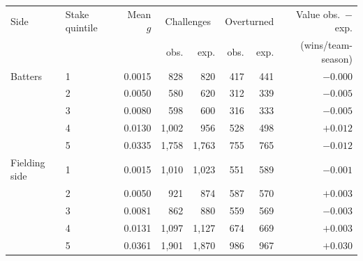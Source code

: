 \begin{tabular}{llrrrrrr}
\toprule
Side & Stake quintile & Mean $g$ & \multicolumn{2}{c}{Challenges} & \multicolumn{2}{c}{Overturned} & Value obs.\ $-$ exp. \\
 & & & obs. & exp. & obs. & exp. & (wins/team-season) \\
\midrule
Batters & 1 & 0.0015 & 828 & 820 & 417 & 441 & $-0.000$ \\
 & 2 & 0.0050 & 580 & 620 & 312 & 339 & $-0.005$ \\
 & 3 & 0.0080 & 598 & 600 & 316 & 333 & $-0.005$ \\
 & 4 & 0.0130 & 1{,}002 & 956 & 528 & 498 & $+0.012$ \\
 & 5 & 0.0335 & 1{,}758 & 1{,}763 & 755 & 765 & $-0.012$ \\
\addlinespace
Fielding side & 1 & 0.0015 & 1{,}010 & 1{,}023 & 551 & 589 & $-0.001$ \\
 & 2 & 0.0050 & 921 & 874 & 587 & 570 & $+0.003$ \\
 & 3 & 0.0081 & 862 & 880 & 559 & 569 & $-0.003$ \\
 & 4 & 0.0131 & 1{,}097 & 1{,}127 & 674 & 669 & $+0.003$ \\
 & 5 & 0.0361 & 1{,}901 & 1{,}870 & 986 & 967 & $+0.030$ \\
\bottomrule
\end{tabular}
